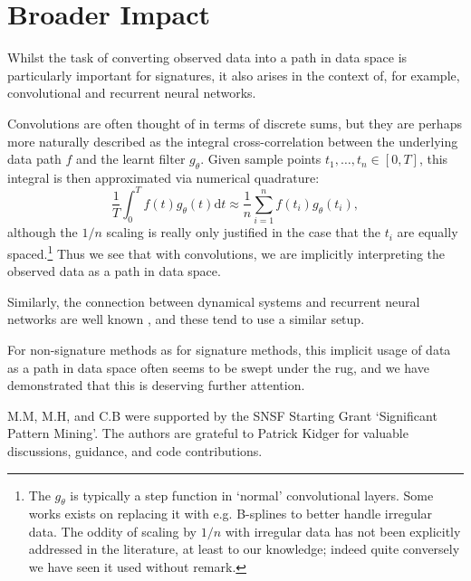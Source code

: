 \documentclass{article}
\begin{document}

\section*{Broader Impact}

Whilst the task of converting observed data into a path in data space is particularly important for signatures, it also arises in the context of, for example, convolutional and recurrent neural networks.

Convolutions are often thought of in terms of discrete sums, but they are perhaps more naturally described as the integral cross-correlation between the underlying data path $f$ and the learnt filter $g_\theta$. Given sample points $t_1, \ldots, t_n \in [0, T]$, this integral is then approximated via numerical quadrature:
\begin{equation*}
    \frac{1}{T}\int_0^T f(t) g_\theta(t) \mathrm{d}t \approx \frac{1}{n}\sum_{i = 1}^n f(t_i) g_\theta(t_i),
\end{equation*}
although the $1/n$ scaling is really only justified in the case that the $t_i$ are equally spaced.\footnote{The $g_\theta$ is typically a step function in `normal' convolutional layers. Some works exists on replacing it with e.g. B-splines \cite{fey2018splinecnn} to better handle irregular data. The oddity of scaling by $1/n$ with irregular data has not been explicitly addressed in the literature, at least to our knowledge; indeed quite conversely we have seen it used without remark.} Thus we see that with convolutions, we are implicitly interpreting the observed data as a path in data space.

Similarly, the connection between dynamical systems and recurrent neural networks are well known \cite{FUNAHASHI1993801, continuousrnn}, and these tend to use a similar setup.

For non-signature methods as for signature methods, this implicit usage of data as a path in data space often seems to be swept under the rug, and we have demonstrated that this is deserving further attention.

\begin{ack}
M.M, M.H, and C.B were supported by the SNSF Starting Grant `Significant
Pattern Mining'. The authors are grateful to Patrick Kidger for valuable discussions, guidance, and code contributions.
\end{ack}
\end{document}
